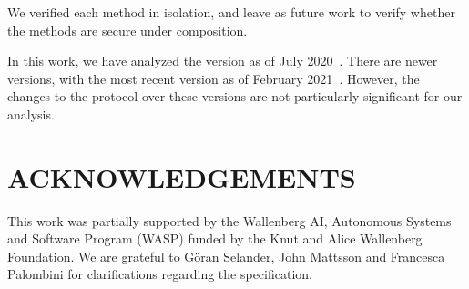 \documentclass[runningheads]{llncs}
\begin{document}
We verified each method in isolation, and leave as future work to verify whether
the methods are secure under composition.

In this work, we have analyzed the \mEdhoc{} version as of July
2020~\cite{our-analysis-selander-lake-edhoc-00}.
%
There are newer versions, with the most recent version as
of February 2021~\cite{latest-ietf-lake-edhoc-05}.
%
However, the changes to the protocol over these versions are not
particularly significant for our analysis.
%

\section*{ACKNOWLEDGEMENTS}
This work was partially supported by
the Wallenberg AI, Autonomous Systems and Software Program (WASP) funded by
the Knut and Alice Wallenberg Foundation.
%
We are grateful to G\"oran Selander, John Mattsson and Francesca Palombini for
clarifications regarding the specification.
%


{\small
    
}
\end{document}
